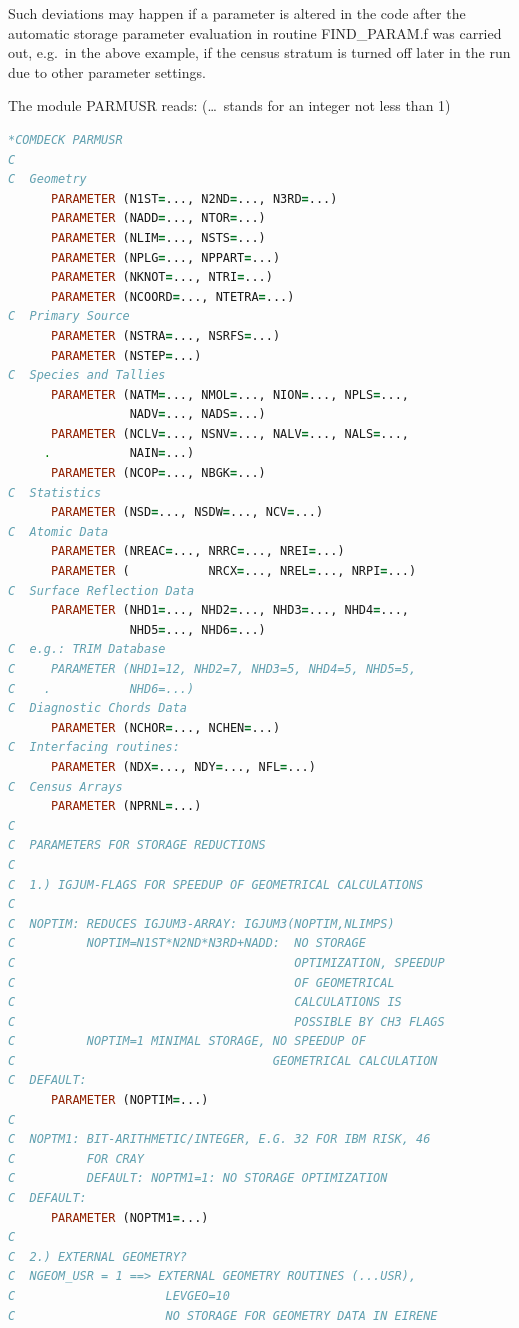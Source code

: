 Such deviations may happen if a parameter is altered in the code after the
automatic storage parameter evaluation in routine FIND\_PARAM.f was carried
out, e.g.\ in the above example, if the census stratum is turned off later in
the run due to other parameter settings.

The module PARMUSR reads: (\dots\ stands for an integer not less than 1)

\begin{lstlisting}[language={Fortran}]
*COMDECK PARMUSR
C
C  Geometry
      PARAMETER (N1ST=..., N2ND=..., N3RD=...)
      PARAMETER (NADD=..., NTOR=...)
      PARAMETER (NLIM=..., NSTS=...)
      PARAMETER (NPLG=..., NPPART=...)
      PARAMETER (NKNOT=..., NTRI=...)
      PARAMETER (NCOORD=..., NTETRA=...)
C  Primary Source
      PARAMETER (NSTRA=..., NSRFS=...)
      PARAMETER (NSTEP=...)
C  Species and Tallies
      PARAMETER (NATM=..., NMOL=..., NION=..., NPLS=...,
                 NADV=..., NADS=...)
      PARAMETER (NCLV=..., NSNV=..., NALV=..., NALS=..., 
     .           NAIN=...)
      PARAMETER (NCOP=..., NBGK=...)
C  Statistics
      PARAMETER (NSD=..., NSDW=..., NCV=...)
C  Atomic Data
      PARAMETER (NREAC=..., NRRC=..., NREI=...)
      PARAMETER (           NRCX=..., NREL=..., NRPI=...)
C  Surface Reflection Data
      PARAMETER (NHD1=..., NHD2=..., NHD3=..., NHD4=...,
                 NHD5=..., NHD6=...)
C  e.g.: TRIM Database
C     PARAMETER (NHD1=12, NHD2=7, NHD3=5, NHD4=5, NHD5=5, 
C    .           NHD6=...)
C  Diagnostic Chords Data
      PARAMETER (NCHOR=..., NCHEN=...)
C  Interfacing routines:
      PARAMETER (NDX=..., NDY=..., NFL=...)
C  Census Arrays
      PARAMETER (NPRNL=...)
C
C  PARAMETERS FOR STORAGE REDUCTIONS
C
C  1.) IGJUM-FLAGS FOR SPEEDUP OF GEOMETRICAL CALCULATIONS
C
C  NOPTIM: REDUCES IGJUM3-ARRAY: IGJUM3(NOPTIM,NLIMPS)
C          NOPTIM=N1ST*N2ND*N3RD+NADD:  NO STORAGE 
C                                       OPTIMIZATION, SPEEDUP 
C                                       OF GEOMETRICAL
C                                       CALCULATIONS IS
C                                       POSSIBLE BY CH3 FLAGS
C          NOPTIM=1 MINIMAL STORAGE, NO SPEEDUP OF
C                                    GEOMETRICAL CALCULATION
C  DEFAULT:
      PARAMETER (NOPTIM=...)
C
C  NOPTM1: BIT-ARITHMETIC/INTEGER, E.G. 32 FOR IBM RISK, 46 
C          FOR CRAY
C          DEFAULT: NOPTM1=1: NO STORAGE OPTIMIZATION
C  DEFAULT:
      PARAMETER (NOPTM1=...)
C
C  2.) EXTERNAL GEOMETRY?
C  NGEOM_USR = 1 ==> EXTERNAL GEOMETRY ROUTINES (...USR), 
C                     LEVGEO=10
C                     NO STORAGE FOR GEOMETRY DATA IN EIRENE

\end{lstlisting}
